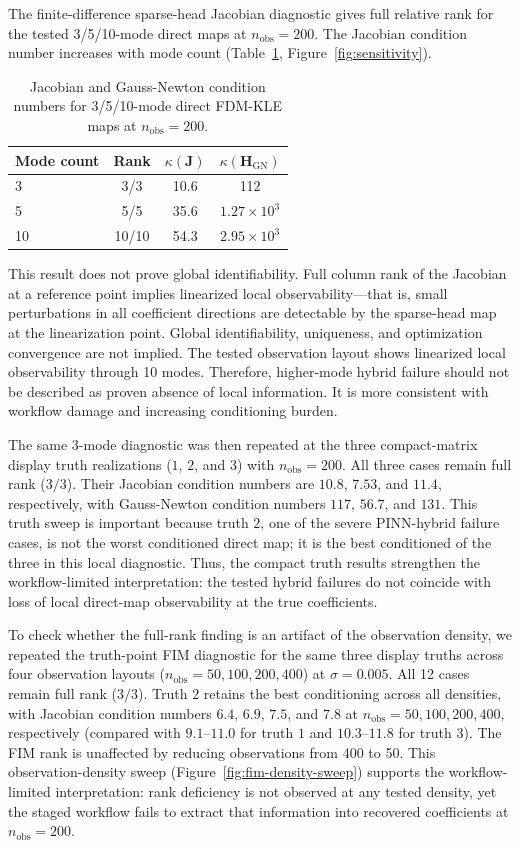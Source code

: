 \documentclass[pdflatex,sn-mathphys,Numbered,iicol]{sn-jnl}
\newcommand{\nobs}{n_{\mathrm{obs}}}
\newcommand{\kappaJ}{\kappa(\mathbf{J})}
\newcommand{\kappaHGN}{\kappa(\mathbf{H}_{\mathrm{GN}})}
\begin{document}
The finite-difference sparse-head Jacobian diagnostic gives full relative rank
for the tested 3/5/10-mode direct maps at $\nobs=200$. The Jacobian condition
number increases with mode count
(Table~\ref{tab:cond}, Figure~\ref{fig:sensitivity}).

\begin{table}[t]
  \caption{Jacobian and Gauss-Newton condition numbers for 3/5/10-mode
    direct FDM-KLE maps at $\nobs=200$.}
  \label{tab:cond}
  \centering
  \begin{tabular}{lccc}
    \toprule
    Mode count & Rank & $\kappaJ$ & $\kappaHGN$ \\
    \midrule
    3  & 3/3 & 10.6 & 112 \\
    5  & 5/5 & 35.6 & $1.27\times10^{3}$ \\
    10 & 10/10 & 54.3 & $2.95\times10^{3}$ \\
    \bottomrule
  \end{tabular}
\end{table}

This result does not prove global identifiability. Full column rank of the
Jacobian at a reference point implies linearized local observability---that is,
small perturbations in all coefficient directions are detectable by the
sparse-head map at the linearization point. Global identifiability, uniqueness,
and optimization convergence are not implied. The tested observation layout
shows linearized local observability through 10 modes. Therefore, higher-mode
hybrid failure should not be described as proven absence of local information.
It is more consistent with workflow damage and increasing conditioning burden.

The same 3-mode diagnostic was then repeated at the three compact-matrix display
truth realizations ($1$, $2$, and $3$) with $\nobs=200$. All three cases
remain full rank ($3/3$). Their Jacobian condition numbers are $10.8$,
$7.53$, and $11.4$, respectively, with Gauss-Newton condition numbers $117$,
$56.7$, and $131$. This truth sweep is important because truth $2$, one of
the severe PINN-hybrid failure cases, is not the worst conditioned direct map;
it is the best conditioned of the three in this local diagnostic. Thus, the
compact truth results strengthen the workflow-limited interpretation: the
tested hybrid failures do not coincide with loss of local direct-map
observability at the true coefficients.

To check whether the full-rank finding is an artifact of the observation
density, we repeated the truth-point FIM diagnostic for the same three display truths
across four observation layouts ($\nobs = 50, 100, 200, 400$) at
$\sigma=0.005$. All 12 cases remain full rank ($3/3$). Truth $2$ retains
the best conditioning across all densities, with Jacobian condition numbers
$6.4$, $6.9$, $7.5$, and $7.8$ at $\nobs=50, 100, 200, 400$,
respectively (compared with $9.1$--$11.0$ for truth $1$ and $10.3$--$11.8$
for truth $3$). The FIM rank is unaffected by reducing observations from 400 to
50. This observation-density sweep (Figure~\ref{fig:fim-density-sweep}) supports the workflow-limited
interpretation: rank deficiency is not observed at any tested density, yet the
staged workflow fails to extract that information into recovered coefficients at
$\nobs=200$.
\end{document}
